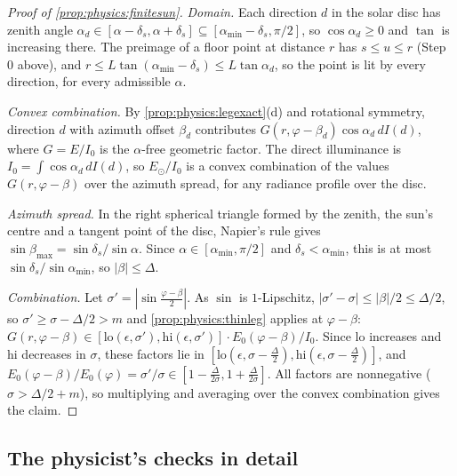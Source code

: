 \begin{proof}[Proof of \cref{prop:physics:finitesun}]
\emph{Domain.} Each direction $d$ in the solar disc has zenith angle
$\alpha_d\in[\alpha-\delta_s,\alpha+\delta_s]\subseteq[\alpha_{\min}-\delta_s,\pi/2]$, so $\cos\alpha_d\ge0$ and $\tan$ is increasing there. The preimage of a floor point at distance
$r$ has $s\le u\le r$ (Step 0 above), and $r\le L\tan(\alpha_{\min}-\delta_s)\le L\tan\alpha_d$,
so the point is lit by every direction, for every admissible $\alpha$.

\emph{Convex combination.} By \cref{prop:physics:legexact}(d) and rotational symmetry, direction
$d$ with azimuth offset $\beta_d$ contributes $G(r,\varphi-\beta_d)\cos\alpha_d\,dI(d)$, where
$G=E/I_0$ is the $\alpha$-free geometric factor. The direct illuminance is
$I_0=\int\cos\alpha_d\,dI(d)$, so $E_\odot/I_0$ is a convex combination of the values
$G(r,\varphi-\beta)$ over the azimuth spread, for any radiance profile over the disc.

\emph{Azimuth spread.} In the right spherical triangle formed by the zenith, the sun's centre
and a tangent point of the disc, Napier's rule gives $\sin\beta_{\max}=\sin\delta_s/\sin\alpha$.
Since $\alpha\in[\alpha_{\min},\pi/2]$ and $\delta_s<\alpha_{\min}$, this is at most
$\sin\delta_s/\sin\alpha_{\min}$, so $|\beta|\le\Delta$.

\emph{Combination.} Let $\sigma'=|\sin\frac{\varphi-\beta}2|$. As $\sin$ is $1$-Lipschitz,
$|\sigma'-\sigma|\le|\beta|/2\le\Delta/2$, so $\sigma'\ge\sigma-\Delta/2>m$ and
\cref{prop:physics:thinleg} applies at $\varphi-\beta$:
$G(r,\varphi-\beta)\in[\mathrm{lo}(\epsilon,\sigma'),\mathrm{hi}(\epsilon,\sigma')]\cdot E_0(\varphi-\beta)/I_0$.
Since $\mathrm{lo}$ increases and $\mathrm{hi}$ decreases in $\sigma$, these factors lie in
$[\mathrm{lo}(\epsilon,\sigma-\frac\Delta2),\mathrm{hi}(\epsilon,\sigma-\frac\Delta2)]$, and
$E_0(\varphi-\beta)/E_0(\varphi)=\sigma'/\sigma\in[1-\frac\Delta{2\sigma},1+\frac\Delta{2\sigma}]$.
All factors are nonnegative ($\sigma>\Delta/2+m$), so multiplying and averaging over the convex
combination gives the claim.
\end{proof}

\subsection{The physicist's checks in detail}\label{app:physics:roles}

